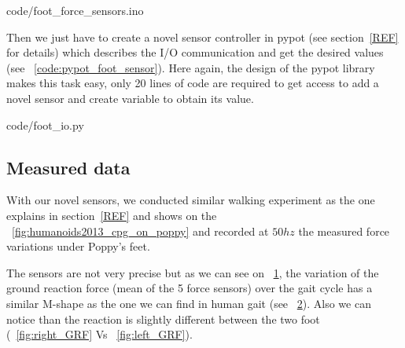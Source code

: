 
    {code/foot_force_sensors.ino}

Then we just have to create a novel sensor controller in pypot (see section~\ref{REF} for details) which describes the I/O communication and get the desired values (see \codename~\ref{code:pypot_foot_sensor}). Here again, the design of the pypot library makes this task easy, only 20 lines of code are required to get access to add a novel sensor and create variable to obtain its value.


    {code/foot_io.py}


\subsection{Measured data} %
With our novel sensors, we conducted similar walking experiment as the one explains in section~\ref{REF} and shows on the \figurename~\ref{fig:humanoids2013_cpg_on_poppy} and recorded at $50hz$ the measured force variations under Poppy's feet.

The sensors are not very precise but as we can see on \figurename~\ref{fig:poppy_GRF}, the variation of the ground reaction force (mean of the 5 force sensors) over the gait cycle has a similar M-shape as the one we can find in human gait (see \figurename~\ref{fig:human_GRF}). Also we can notice than the reaction is slightly different between the two foot (\figurename~\ref{fig:right_GRF} Vs \figurename~\ref{fig:left_GRF}).

\begin{figure}[!ht]
\centering
    \hfil
    \caption{}
    \label{fig:poppy_GRF}
\end{figure}


\begin{figure}[!ht]
\centering
    \hfil
    \caption{}
    \label{fig:human_GRF}
\end{figure}


